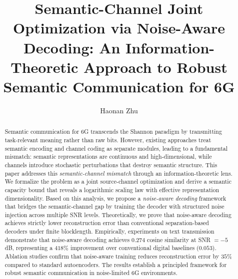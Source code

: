 \documentclass[a4paper,fleqn]{cas-sc}
\begin{document}
\let\WriteBookmarks\relax
\def\floatpagepagefraction{1}
\def\textpagefraction{.001}


\title[mode = title]{Semantic-Channel Joint Optimization via Noise-Aware Decoding: An Information-Theoretic Approach to Robust Semantic Communication for 6G}


\author[1]{Haonan Zhu}
\cormark[1]
\fnmark[1]



\begin{abstract}
Semantic communication for 6G transcends the Shannon paradigm by transmitting task-relevant meaning rather than raw bits. However, existing approaches treat semantic encoding and channel coding as separate modules, leading to a fundamental mismatch: semantic representations are continuous and high-dimensional, while channels introduce stochastic perturbations that destroy semantic structure. This paper addresses this \emph{semantic-channel mismatch} through an information-theoretic lens. We formalize the problem as a joint source-channel optimization and derive a semantic capacity bound that reveals a logarithmic scaling law with effective representation dimensionality. Based on this analysis, we propose a \emph{noise-aware decoding} framework that bridges the semantic-channel gap by training the decoder with structured noise injection across multiple SNR levels. Theoretically, we prove that noise-aware decoding achieves strictly lower reconstruction error than conventional separation-based decoders under finite blocklength. Empirically, experiments on text transmission demonstrate that noise-aware decoding achieves $0.274$ cosine similarity at SNR $= -5$ dB, representing a $418\%$ improvement over conventional digital baselines ($0.053$). Ablation studies confirm that noise-aware training reduces reconstruction error by $35\%$ compared to standard autoencoders. The results establish a principled framework for robust semantic communication in noise-limited 6G environments.
\end{abstract}
\end{document}
